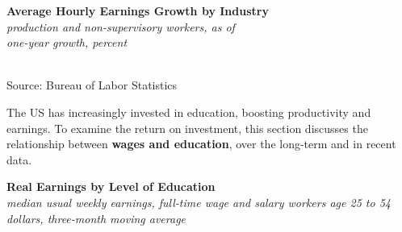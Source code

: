 \documentclass{report}
\newcommand{\tbllink}[1]{\href{https://raw.githubusercontent.com/bdecon/US-chartbook/master/chartbook/data/#1}{\faTable}}
\newcommand{\barylab}[2]{yticklabel style={text width=#1, align=right, 
		style={black!70}, text height=#2},}
\newcommand{\bbar}[2]{extra #1 ticks = {{#2}}, extra #1 tick labels = ,
		extra #1 tick style = {grid=major, grid style={thick, black!25}},}
\newcommand{\barplotnogrid}{xbar=0pt, axis line style={draw=none},
	    yticklabel style={align=left, anchor=east},
      		xmajorticks=false, ymajorgrids=false,   
	    ytick=data, tickwidth=0pt, area legend, reverse legend,
	    nodes near coords align={horizontal},}
\begin{document}
{\begin{minipage}{0.76\textwidth}
\normalsize \textbf{Average Hourly Earnings Growth by Industry}\\
\footnotesize{\textit{production and non-supervisory workers, as of }}\\
\footnotesize{\textit{one-year growth, percent}}\\
\hspace*{-2mm} \\ 
\footnotesize{Source: Bureau of Labor Statistics} \hspace{64mm} \tbllink{ahe_ind.csv}
\end{minipage}
\newpage
\begin{minipage}{0.76\textwidth}
\small The US has increasingly invested in education, boosting productivity and earnings. To examine the return on investment, this section discusses the relationship between \textbf{wages and education}, over the long-term and in recent data. 


\vspace{1mm}

\normalsize \textbf{Real Earnings by Level of Education}\\
\footnotesize{\textit{median usual weekly earnings, full-time wage and salary workers age 25 to 54}}\\
\footnotesize{\textit{dollars, three-month moving average}}
\vspace{5.6cm}


\end{minipage}}
\end{document}

